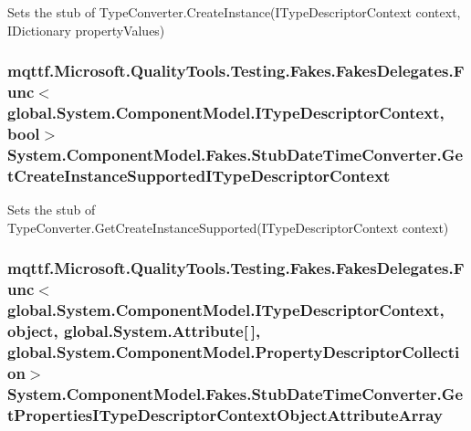 Sets the stub of Type\-Converter.\-Create\-Instance(\-I\-Type\-Descriptor\-Context context, I\-Dictionary property\-Values)

\hypertarget{class_system_1_1_component_model_1_1_fakes_1_1_stub_date_time_converter_aa7d4fcd1d339d053bbee299ef14d7976}{
\subsubsection[{Get\-Create\-Instance\-Supported\-I\-Type\-Descriptor\-Context}]{\setlength{\rightskip}{0pt plus 5cm}mqttf.\-Microsoft.\-Quality\-Tools.\-Testing.\-Fakes.\-Fakes\-Delegates.\-Func$<$global.\-System.\-Component\-Model.\-I\-Type\-Descriptor\-Context, bool$>$ System.\-Component\-Model.\-Fakes.\-Stub\-Date\-Time\-Converter.\-Get\-Create\-Instance\-Supported\-I\-Type\-Descriptor\-Context}}\label{class_system_1_1_component_model_1_1_fakes_1_1_stub_date_time_converter_aa7d4fcd1d339d053bbee299ef14d7976}


Sets the stub of Type\-Converter.\-Get\-Create\-Instance\-Supported(\-I\-Type\-Descriptor\-Context context)

\hypertarget{class_system_1_1_component_model_1_1_fakes_1_1_stub_date_time_converter_aa05b2979ae2596d975561e30699d0f80}{
\subsubsection[{Get\-Properties\-I\-Type\-Descriptor\-Context\-Object\-Attribute\-Array}]{\setlength{\rightskip}{0pt plus 5cm}mqttf.\-Microsoft.\-Quality\-Tools.\-Testing.\-Fakes.\-Fakes\-Delegates.\-Func$<$global.\-System.\-Component\-Model.\-I\-Type\-Descriptor\-Context, object, global.\-System.\-Attribute\mbox{[}$\,$\mbox{]}, global.\-System.\-Component\-Model.\-Property\-Descriptor\-Collection$>$ System.\-Component\-Model.\-Fakes.\-Stub\-Date\-Time\-Converter.\-Get\-Properties\-I\-Type\-Descriptor\-Context\-Object\-Attribute\-Array}}\label{class_system_1_1_component_model_1_1_fakes_1_1_stub_date_time_converter_aa05b2979ae2596d975561e30699d0f80}



